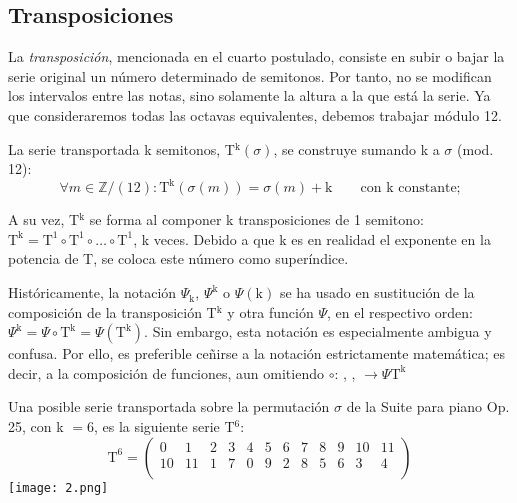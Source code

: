 	\subsection{Transposiciones}
		La \emph{transposición}, mencionada en el cuarto postulado, consiste en subir o bajar la serie original un número determinado de semitonos. Por tanto, no se modifican los intervalos entre las notas, sino solamente la altura a la que está la serie. Ya que consideraremos todas las octavas equivalentes, debemos trabajar módulo 12. 
		
		La serie transportada k semitonos, T$^\text{k}\left(\sigma\right)$, se construye sumando k a $\sigma$ (mod. 12):
		\[
		\forall m\in \mathbb{Z} / (12):	\text{T}^\text{k}\left(\sigma\left(m\right)\right)=\sigma\left(m\right)+\text{k} \qquad \text{con k constante;}
		\]		
		
		A su vez, T$^\text{k}$ se forma al componer k transposiciones de 1 semitono: $\text{T}^\text{k}=\text{T}^1\circ\text{T}^1\circ\ldots\circ\text{T}^1$, k veces. Debido a que k es en realidad el exponente en la potencia de T, se coloca este número como superíndice.
		
		Históricamente, la notación $\Psi_\text{k}$, $\Psi^\text{k}$ o $\Psi(\text{k})$ se ha usado en sustitución de la composición de la transposición T$^\text{k}$ y otra función $\Psi$, en el respectivo orden: $\Psi^\text{k}=\Psi \circ \text{T}^\text{k} = \Psi(\text{T}^\text{k})$. Sin embargo, esta notación es especialmente ambigua y confusa. Por ello, es preferible ceñirse a la notación estrictamente matemática; es decir, a la composición de funciones, aun omitiendo $\circ$: , ,  $\rightarrow \Psi\text{T}^\text{k}$
		
		Una posible serie transportada sobre la permutación $\sigma$ de la Suite para piano Op. 25, con k $= 6$, es la siguiente serie T$^6$:
		\[\text{T}^6=\left(\begin{matrix}0&1&2&3&4&5&6&7&8&9&10&11\\10&11&1&7&0&9&2&8&5&6&3&4\\\end{matrix}\right)\]	
		\texttt{[image: 2.png]}
		
